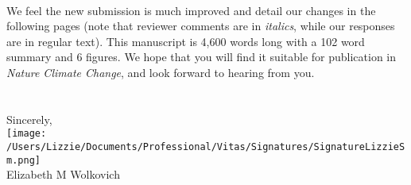 \documentclass[11pt,a4paper]{letter}
\begin{document}
\begin{letter}{}
\vspace{1.5ex}\\
We feel the new submission is much improved and detail our changes in the following pages (note that reviewer comments are in \emph{italics}, while our responses are in regular text). This manuscript is 4,600 words long with a 102 word summary and 6 figures. We hope that you will find it suitable for publication in \emph{Nature Climate Change}, and look forward to hearing from you.
\\
\\\vspace{-1ex}\\
\noindent Sincerely,\\

 \texttt{[image: /Users/Lizzie/Documents/Professional/Vitas/Signatures/SignatureLizzieSm.png]} \\

\noindent Elizabeth M Wolkovich

\end{letter}
\end{document}
